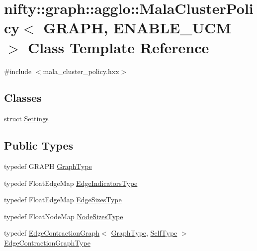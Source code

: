 \hypertarget{classnifty_1_1graph_1_1agglo_1_1MalaClusterPolicy}{}\section{nifty\+:\+:graph\+:\+:agglo\+:\+:Mala\+Cluster\+Policy$<$ G\+R\+A\+P\+H, E\+N\+A\+B\+L\+E\+\_\+\+U\+C\+M $>$ Class Template Reference}
\label{classnifty_1_1graph_1_1agglo_1_1MalaClusterPolicy}


{\ttfamily \#include $<$mala\+\_\+cluster\+\_\+policy.\+hxx$>$}

\subsection*{Classes}
\begin{DoxyCompactItemize}
\item 
struct \hyperlink{structnifty_1_1graph_1_1agglo_1_1MalaClusterPolicy_1_1Settings}{Settings}
\end{DoxyCompactItemize}
\subsection*{Public Types}
\begin{DoxyCompactItemize}
\item 
typedef G\+R\+A\+P\+H \hyperlink{classnifty_1_1graph_1_1agglo_1_1MalaClusterPolicy_ae2696b85f3f04787282e003bead20a5d}{Graph\+Type}
\item 
typedef Float\+Edge\+Map \hyperlink{classnifty_1_1graph_1_1agglo_1_1MalaClusterPolicy_acc2c04742b370c093267afd17a14bb0c}{Edge\+Indicators\+Type}
\item 
typedef Float\+Edge\+Map \hyperlink{classnifty_1_1graph_1_1agglo_1_1MalaClusterPolicy_a33924545e782bd520270341b21599e7e}{Edge\+Sizes\+Type}
\item 
typedef Float\+Node\+Map \hyperlink{classnifty_1_1graph_1_1agglo_1_1MalaClusterPolicy_a559774b548ec31fb481a848a12a45abe}{Node\+Sizes\+Type}
\item 
typedef \hyperlink{classnifty_1_1graph_1_1EdgeContractionGraph}{Edge\+Contraction\+Graph}$<$ \hyperlink{classnifty_1_1graph_1_1agglo_1_1MalaClusterPolicy_ae2696b85f3f04787282e003bead20a5d}{Graph\+Type}, \hyperlink{classnifty_1_1graph_1_1agglo_1_1MalaClusterPolicy}{Self\+Type} $>$ \hyperlink{classnifty_1_1graph_1_1agglo_1_1MalaClusterPolicy_a77a5b41304b53955aafbf214e2ad356f}{Edge\+Contraction\+Graph\+Type}
\end{DoxyCompactItemize}

